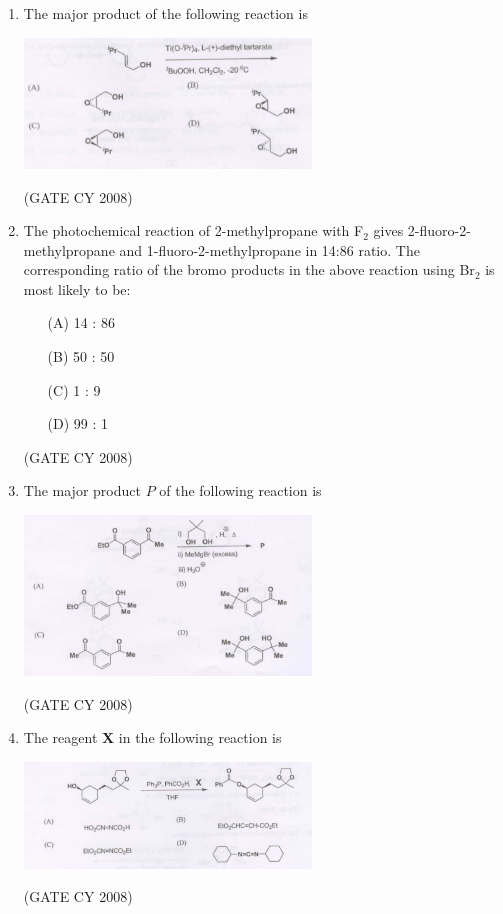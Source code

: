 \documentclass[12pt]{article}
\begin{document}
\begin{enumerate}
\item The major product of the following reaction is

\begin{center}
\includegraphics[width=0.6\textwidth]{figs/q42.png}
\end{center}    \hfill{(GATE CY 2008)}


\item The photochemical reaction of 2-methylpropane with F$_2$ gives 2-fluoro-2-methylpropane and 1-fluoro-2-methylpropane in 14:86 ratio. The corresponding ratio of the bromo products in the above reaction using Br$_2$ is most likely to be:
\begin{enumerate}
\item[(A)] 14 : 86
\item[(B)] 50 : 50
\item[(C)] 1 : 9
\item[(D)] 99 : 1    
\end{enumerate}
\hfill{(GATE CY 2008)}


\item The major product $P$ of the following reaction is

\begin{center}
\includegraphics[width=0.6\textwidth]{figs/q44.png}
\end{center}    \hfill{(GATE CY 2008)}


\item The reagent \textbf{X} in the following reaction is

\begin{center}
\includegraphics[width=0.6\textwidth]{figs/q45.png}
\end{center}    \hfill{(GATE CY 2008)}



\end{enumerate}
\end{document}
